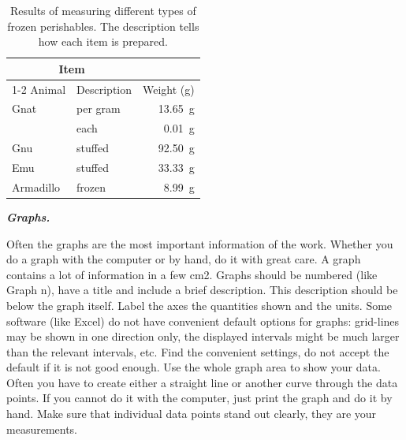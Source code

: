 \documentclass{scrartcl}
\begin{document}
\begin{table}[ht] %
    \centering
    \begin{tabular}{llr} %
\hline
\multicolumn{2}{c}{Item} \\ %
\cline{1-2}
Animal    & Description & Weight (\unit{\gram}) \\
\hline %
Gnat      & per gram    & \qty{13.65}{\gram}      \\ %
          & each        & \qty{0.01}{\gram}       \\ %
Gnu       & stuffed     & \qty{92.50}{\gram}      \\
Emu       & stuffed     & \qty{33.33}{\gram}      \\
Armadillo & frozen      & \qty{8.99}{\gram}       \\
\hline
\end{tabular}
    \caption{Results of measuring different types of frozen perishables.
    The description tells how each item is prepared.}
    \label{tab:my_label}
\end{table}

\textbf{\textit{Graphs.}} 

Often the graphs are the most important information of the work.
Whether you do a graph with the computer or by hand, do it with great care.
A graph contains a lot of information in a few cm2.
Graphs should be numbered (like Graph n), have a title and include a brief description.
This description should be below the graph itself. Label the axes the quantities shown and the units.
Some software (like Excel) do not have convenient default options for graphs:
grid-lines may be shown in one direction only, the displayed intervals might be much larger than the relevant intervals, etc. 
Find the convenient settings, do not accept the default if it is not good enough.
Use the whole graph area to show your data. Often you have to create either a straight line or another curve through the data points.
If you cannot do it with the computer, just print the graph and do it by hand.
Make sure that individual data points stand out clearly, they are your measurements.
\end{document}
